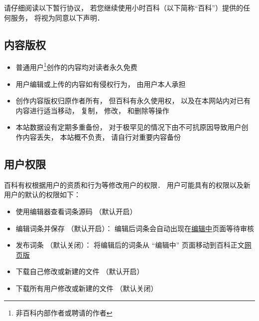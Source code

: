 
请仔细阅读以下暂行协议， 若您继续使用小时百科（以下简称“百科”）提供的任何服务， 将视为同意以下声明．

\subsection{内容版权}
\begin{itemize}
\item 普通用户\footnote{非百科内部作者或聘请的作者}创作的内容均对读者永久免费
\item 用户编辑或上传的内容如有侵权行为， 由用户本人承担
\item 创作内容版权归原作者所有， 但百科有永久使用权， 以及在本网站内对已有内容进行适当移动， 复制， 修改， 和删除等操作
\item 本站数据设有定期多重备份， 对于极罕见的情况下由不可抗原因导致用户创作内容丢失， 本站概不负责， 请自行对重要内容备份
\end{itemize}

\subsection{用户权限}
百科有权根据用户的资质和行为等修改用户的权限． 用户可能具有的权限以及新用户的默认的权限如下：
\begin{itemize}
\item 使用编辑器查看词条源码 （默认开启）
\item 编辑词条并保存 （默认开启）： 编辑后词条会自动出现在\href{http://wuli.wiki/changed}{编辑中}页面等待审核
\item 发布词条 （默认关闭）： 将编辑后的词条从 “编辑中” 页面移动到百科正文\href{http://wuli.wiki/online}{网页版}
\item 下载自己修改或新建的文件 （默认开启）
\item 下载所有用户修改或新建的文件 （默认关闭）
\end{itemize}
